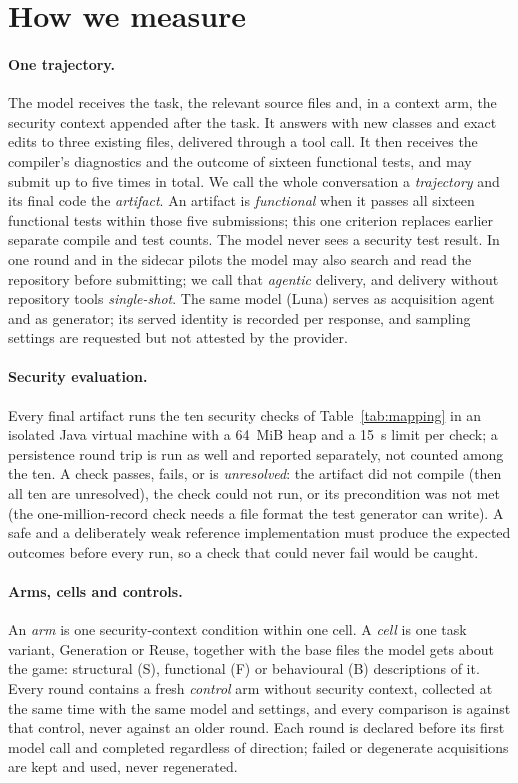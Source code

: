 \section{How we measure}
\label{sec:method}

\paragraph{One trajectory.}
The model receives the task, the relevant source files and, in a context
arm, the security context appended after the task. It answers with new
classes and exact edits to three existing files, delivered through a tool
call. It then receives the compiler's diagnostics and the outcome of
sixteen functional tests, and may submit up to five times in total. We call
the whole conversation a \emph{trajectory} and its final code the
\emph{artifact}. An artifact is \emph{functional} when it passes all
sixteen functional tests within those five submissions; this one criterion
replaces earlier separate compile and test counts.
The model never sees a security test result. In one round and in the
sidecar pilots the model may also search and read the repository before
submitting; we call that \emph{agentic} delivery, and delivery without
repository tools \emph{single-shot}. The same model (Luna) serves as
acquisition agent and as generator; its served identity is recorded per
response, and sampling settings are requested but not attested by the
provider.

\paragraph{Security evaluation.}
Every final artifact runs the ten security checks of
Table~\ref{tab:mapping} in an isolated Java virtual machine with a 64~MiB
heap and a 15~s limit per check; a persistence round trip is run as well
and reported separately, not counted among the ten. A check passes,
fails, or is \emph{unresolved}: the artifact did not compile (then all ten
are unresolved), the check could not run, or its precondition was not met
(the one-million-record check needs a file format the test generator can
write). A safe and a deliberately weak reference implementation must
produce the expected outcomes before every run, so a check that could never
fail would be caught.

\paragraph{Arms, cells and controls.}
An \emph{arm} is one security-context condition within one cell. A
\emph{cell} is one task variant, Generation or Reuse, together with the
base files the model gets about the game: structural (S), functional (F)
or behavioural (B) descriptions of it. Every round contains a fresh
\emph{control} arm without security context, collected at the same time
with the same model and settings, and every comparison is against that
control, never against an older round. Each round is declared before its
first model call and completed regardless of direction; failed or
degenerate acquisitions are kept and used, never regenerated.

